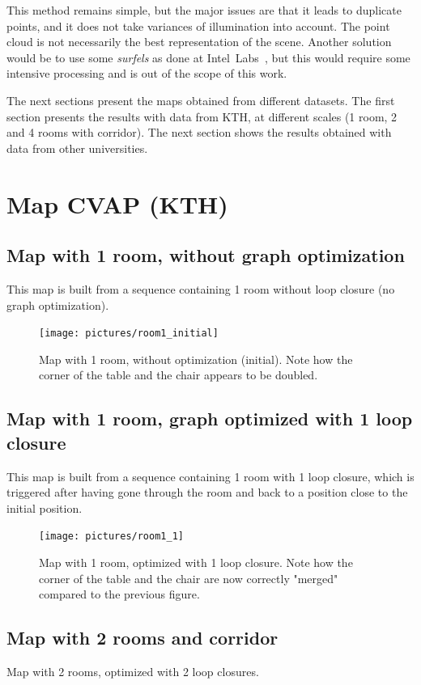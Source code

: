 This method remains simple, but the major issues are that it leads to duplicate points, and it does not take variances of illumination into account. The point cloud is not necessarily the best representation of the scene. Another solution would be to use some \emph{surfels} as done at Intel~Labs~\cite{Intel_RGBD_2010}, but this would require some intensive processing and is out of the scope of this work.

The next sections present the maps obtained from different datasets. The first section presents the results with data from KTH, at different scales (1 room, 2 and 4 rooms with corridor). The next section shows the results obtained with data from other universities.

\section{Map CVAP (KTH)}

\subsection{Map with 1 room, without graph optimization}

This map is built from a sequence containing 1 room without loop closure (no graph optimization). 

\begin{figure}[h!]
\centering
\texttt{[image: pictures/room1\_initial]}
\caption{Map with 1 room, without optimization (initial). Note how the corner of the table and the chair appears to be doubled.}
\end{figure}

\subsection{Map with 1 room, graph optimized with 1 loop closure}
This map is built from a sequence containing 1 room with 1 loop closure, which is triggered after having gone through the room and back to a position close to the initial position. 

\begin{figure}[h!]
\centering
\texttt{[image: pictures/room1\_1]}
\caption{Map with 1 room, optimized with 1 loop closure. Note how the corner of the table and the chair are now correctly "merged" compared to the previous figure.}
\end{figure}

\clearpage

\subsection{Map with 2 rooms and corridor}
Map with 2 rooms, optimized with 2 loop closures.

